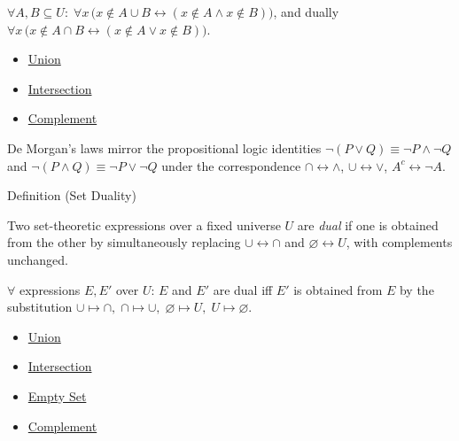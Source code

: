 \begin{remark*}
$\forall A, B \subseteq U:\; \forall x\,\bigl(x \notin A \cup B \leftrightarrow (x \notin A \wedge x \notin B)\bigr)$, and dually $\forall x\,\bigl(x \notin A \cap B \leftrightarrow (x \notin A \vee x \notin B)\bigr)$.
\end{remark*}

\begin{dependencies}
\begin{itemize}
  \item \hyperref[def:union]{Union}
  \item \hyperref[def:intersection]{Intersection}
  \item \hyperref[def:complement]{Complement}
\end{itemize}
\end{dependencies}

\begin{remark*}
De Morgan's laws mirror the propositional logic identities $\neg(P \lor Q) \equiv \neg P \land \neg Q$ and $\neg(P \land Q) \equiv \neg P \lor \neg Q$ under the correspondence $\cap \leftrightarrow \land$, $\cup \leftrightarrow \lor$, $A^c \leftrightarrow \neg A$.
\end{remark*}

\begin{definitionbox}{Definition (Set Duality)}
\begin{definition}\label{def:set-duality}
Two set-theoretic expressions over a fixed universe $U$ are \emph{dual} if one
is obtained from the other by simultaneously replacing
$\cup \leftrightarrow \cap$ and $\varnothing \leftrightarrow U$, with
complements unchanged.
\end{definition}
\end{definitionbox}

\begin{remark*}
$\forall$ expressions $E, E'$ over $U$: $E$ and $E'$ are dual iff $E'$ is obtained from $E$ by the substitution $\cup \mapsto \cap,\; \cap \mapsto \cup,\; \varnothing \mapsto U,\; U \mapsto \varnothing$.
\end{remark*}

\begin{dependencies}
\begin{itemize}
  \item \hyperref[def:union]{Union}
  \item \hyperref[def:intersection]{Intersection}
  \item \hyperref[def:empty-set]{Empty Set}
  \item \hyperref[def:complement]{Complement}
\end{itemize}
\end{dependencies}

